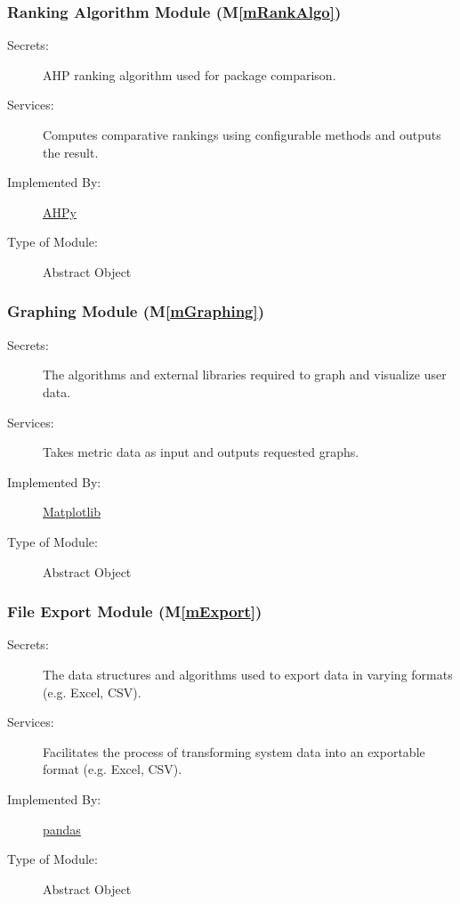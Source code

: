 \documentclass[12pt, titlepage]{article}
\newcommand{\mref}[1]{M\ref{#1}}
\begin{document}
\subsubsection{Ranking Algorithm Module (\mref{mRankAlgo})}
\begin{description}
\item[Secrets:] AHP ranking algorithm used for package comparison.
\item[Services:] Computes comparative rankings using configurable methods and outputs the result.
\item[Implemented By:] \href{https://pypi.org/project/AHPy/}{AHPy}
\item[Type of Module:] Abstract Object
\end{description}

\subsubsection{Graphing Module (\mref{mGraphing})}
\begin{description}
\item[Secrets:] The algorithms and external libraries required to graph and visualize user data.
\item[Services:] Takes metric data as input and outputs requested graphs.
\item[Implemented By:] \href{https://pypi.org/project/matplotlib/}{Matplotlib}
\item[Type of Module:] Abstract Object
\end{description}

\subsubsection{File Export Module (\mref{mExport})}
\begin{description}
\item[Secrets:] The data structures and algorithms used to export data in varying formats (e.g. Excel, CSV).
\item[Services:] Facilitates the process of transforming system data into an exportable format (e.g. Excel, CSV).
\item[Implemented By:] \href{https://pypi.org/project/pandas/}{pandas}
\item[Type of Module:] Abstract Object
\end{description}
\end{document}
